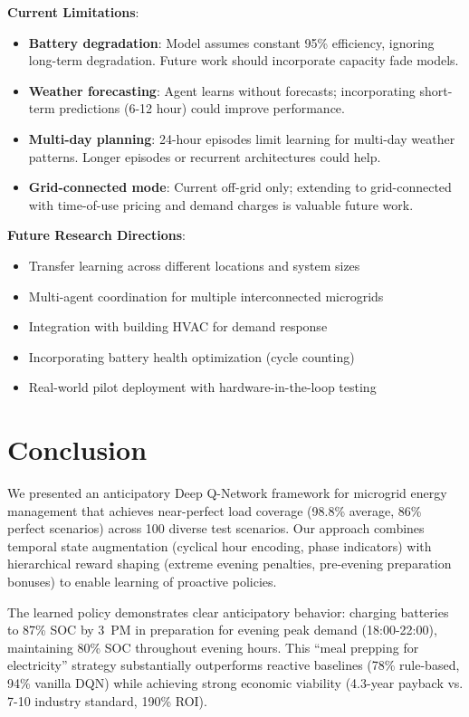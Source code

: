 \documentclass[11pt,a4paper]{article}
\begin{document}
\textbf{Current Limitations}:
\begin{itemize}
    \item \textbf{Battery degradation}: Model assumes constant 95\% efficiency, ignoring long-term degradation. Future work should incorporate capacity fade models.
    \item \textbf{Weather forecasting}: Agent learns without forecasts; incorporating short-term predictions (6-12 hour) could improve performance.
    \item \textbf{Multi-day planning}: 24-hour episodes limit learning for multi-day weather patterns. Longer episodes or recurrent architectures could help.
    \item \textbf{Grid-connected mode}: Current off-grid only; extending to grid-connected with time-of-use pricing and demand charges is valuable future work.
\end{itemize}

\textbf{Future Research Directions}:
\begin{itemize}
    \item Transfer learning across different locations and system sizes
    \item Multi-agent coordination for multiple interconnected microgrids
    \item Integration with building HVAC for demand response
    \item Incorporating battery health optimization (cycle counting)
    \item Real-world pilot deployment with hardware-in-the-loop testing
\end{itemize}

\section{Conclusion}
\label{sec:conclusion}

We presented an anticipatory Deep Q-Network framework for microgrid energy management that achieves near-perfect load coverage (98.8\% average, 86\% perfect scenarios) across 100 diverse test scenarios. Our approach combines temporal state augmentation (cyclical hour encoding, phase indicators) with hierarchical reward shaping (extreme evening penalties, pre-evening preparation bonuses) to enable learning of proactive policies.

The learned policy demonstrates clear anticipatory behavior: charging batteries to 87\% SOC by 3~PM in preparation for evening peak demand (18:00-22:00), maintaining 80\% SOC throughout evening hours. This ``meal prepping for electricity'' strategy substantially outperforms reactive baselines (78\% rule-based, 94\% vanilla DQN) while achieving strong economic viability (4.3-year payback vs. 7-10 industry standard, 190\% ROI).
\end{document}
